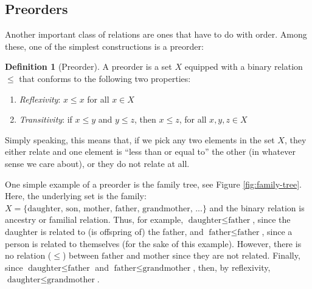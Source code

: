 \documentclass[
]{book}
\providecommand{\tightlist}{%
  \setlength{\itemsep}{0pt}\setlength{\parskip}{0pt}}
\theoremstyle{definition}
\newtheorem{definition}{Definition}[chapter]
\theoremstyle{definition}
\theoremstyle{definition}
\theoremstyle{definition}
\theoremstyle{remark}
\begin{document}
\subsection{Preorders}\label{preorders}

Another important class of relations are ones that have to do with order. Among these, one of the simplest constructions is a preorder:

\begin{definition}[Preorder]

A preorder is a set \(X\) equipped with a binary relation \(\leq\) that conforms to the following two properties:

\begin{enumerate}
\def\labelenumi{\arabic{enumi}.}
\tightlist
\item
  \emph{Reflexivity}: \(x \leq x\) for all \(x \in X\)
\item
  \emph{Transitivity}: if \(x \leq y\) and \(y \leq z\), then \(x \leq z\), for all \(x, y, z \in X\)
\end{enumerate}

\end{definition}

Simply speaking, this means that, if we pick any two elements in the set \(X\), they either relate and one element is ``less than or equal to'' the other (in whatever sense we care about), or they do not relate at all.

One simple example of a preorder is the family tree, see Figure \ref{fig:family-tree}. Here, the underlying set is the family: \(X = \{  \text{daughter, son, mother, father, grandmother, ...} \}\) and the binary relation is ancestry or familial relation. Thus, for example, \(\text{daughter} \leq \text{father}\), since the daughter is related to (is offspring of) the father, and \(\text{father} \leq \text{father}\), since a person is related to themselves (for the sake of this example). However, there is no relation (\(\leq\)) between \(\text{father}\) and \(\text{mother}\) since they are not related. Finally, since \(\text{daughter} \leq \text{father}\) and \(\text{father} \leq \text{grandmother}\), then, by reflexivity, \(\text{daughter} \leq \text{grandmother}\).
\end{document}
